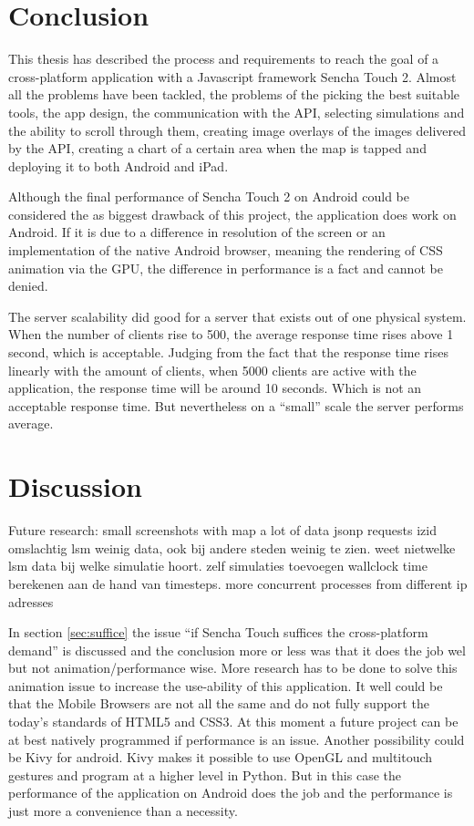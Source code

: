 \section{Conclusion}
This thesis has described the process and requirements to reach the goal of a cross-platform application with a Javascript framework Sencha Touch 2. Almost all the problems have been tackled, the problems of the picking the best suitable tools, the app design, the communication with the API, selecting simulations and the ability to scroll through them, creating image overlays of the images delivered by the API, creating a chart of a certain area when the map is tapped and deploying it to both Android and iPad. 

Although the final performance of Sencha Touch 2 on Android could be considered the as biggest drawback of this project, the application does work on Android. If it is due to a difference in resolution of the screen or an implementation of the native Android browser, meaning the rendering of CSS animation via the GPU, the difference in performance is a fact and cannot be denied. 

The server scalability did good for a server that exists out of one physical system. When the number of clients rise to 500, the average response time rises above 1 second, which is acceptable. Judging from the fact that the response time rises linearly with the amount of clients, when 5000 clients are active with the application, the response time will be around 10 seconds. Which is not an acceptable response time. But nevertheless on a ``small'' scale the server performs average.

\section{Discussion}
Future research:
small screenshots with map
a lot of data
jsonp
requests izid omslachtig
lsm weinig data, ook bij andere steden weinig te zien.
weet nietwelke lsm data bij welke simulatie hoort.
zelf simulaties toevoegen
wallclock time berekenen aan de hand van timesteps.
more concurrent processes from different ip adresses

In section \ref{sec:suffice} the issue ``if Sencha Touch suffices the cross-platform demand'' is discussed and the conclusion more or less was that it does the job wel but not animation/performance wise. More research has to be done to solve this animation issue to increase the use-ability of this application. It well could be that the Mobile Browsers are not all the same and do not fully support the today's standards of HTML5 and CSS3. At this moment a future project can be at best natively programmed if performance is an issue. Another possibility could be Kivy \cite{kivy} for android. Kivy makes it possible to use OpenGL \cite{opengl} and multitouch gestures and program at a higher level in Python\cite{python}. But in this case the performance of the application on Android does the job and the performance is just more a convenience than a necessity. 

